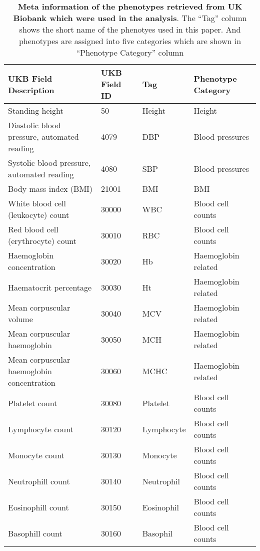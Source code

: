 \begin{table}[ht]
\centering
\begingroup\scriptsize
\begin{tabular}{llll}
  \toprule
{\textbf{UKB Field Description}} & {\textbf{UKB Field ID}} & {\textbf{Tag}} & {\textbf{Phenotype Category}} \\ 
  \midrule
Standing height & 50 & Height & Height \\ 
  Diastolic blood pressure, automated reading & 4079 & DBP & Blood pressures \\ 
  Systolic blood pressure, automated reading & 4080 & SBP & Blood pressures \\ 
  Body mass index (BMI) & 21001 & BMI & BMI \\ 
  White blood cell (leukocyte) count & 30000 & WBC & Blood cell counts \\ 
  Red blood cell (erythrocyte) count & 30010 & RBC & Blood cell counts \\ 
  Haemoglobin concentration & 30020 & Hb & Haemoglobin related \\ 
  Haematocrit percentage & 30030 & Ht & Haemoglobin related \\ 
  Mean corpuscular volume & 30040 & MCV & Haemoglobin related \\ 
  Mean corpuscular haemoglobin & 30050 & MCH & Haemoglobin related \\ 
  Mean corpuscular haemoglobin concentration & 30060 & MCHC & Haemoglobin related \\ 
  Platelet count & 30080 & Platelet & Blood cell counts \\ 
  Lymphocyte count & 30120 & Lymphocyte & Blood cell counts \\ 
  Monocyte count & 30130 & Monocyte & Blood cell counts \\ 
  Neutrophill count & 30140 & Neutrophil & Blood cell counts \\ 
  Eosinophill count & 30150 & Eosinophil & Blood cell counts \\ 
  Basophill count & 30160 & Basophil & Blood cell counts \\ 
   \bottomrule
\end{tabular}
\endgroup
\caption{\textbf{Meta information of the phenotypes retrieved from UK Biobank which were used in the analysis}. The ``Tag'' column shows the short name of the phenotyes used in this paper. And phenotypes are assigned into five categories which are shown in ``Phenotype Category'' column} 
\label{tab:trait_table}
\end{table}
